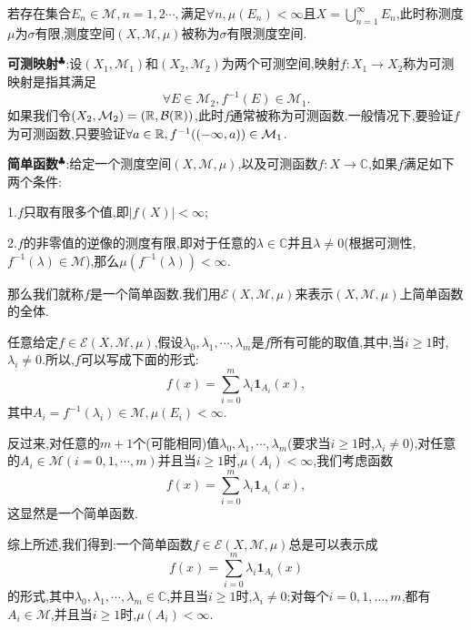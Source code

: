 若存在集合$E_n\in\mathcal{M},n=1,2\cdots,$满足$\forall n,\mu(E_n)<\infty$且$X=\bigcup_{n=1}^{\infty}E_n$,此时称测度$\mu$为$\sigma$有限,测度空间$(X,\mathcal{M},\mu)$被称为$\sigma$有限测度空间.\par
\textbf{可测映射}$^\clubsuit $:设$(X_1,\mathcal{M}_1)$和$(X_2,\mathcal{M}_2)$为两个可测空间,映射$f:X_1\to X_2$称为可测映射是指其满足
$$
\forall E\in\mathcal{M}_2,f^{-1}(E)\in\mathcal{M}_1.
$$
如果我们令$(X_2,\mathcal{M}_2)=(\mathbb{R},\mathcal{B}(\mathbb{R}))$,此时$f$通常被称为可测函数.一般情况下,要验证$f$为可测函数,只要验证$\forall a\in\mathbb{R},f^{-1}((-\infty,a))\in\mathcal{M}_1$.\par
\textbf{简单函数}$^\clubsuit $:给定一个测度空间$(X,\mathcal{M},\mu)$,以及可测函数$f:X\to \mathbb{C}$,如果$f$满足如下两个条件:\par
1.$f$只取有限多个值,即$|f(X)|<\infty$;\par
2.$f$的非零值的逆像的测度有限,即对于任意的$\lambda \in \mathbb{C}$并且$\lambda\neq 0$(根据可测性,$f^{-1}(\lambda)\in\mathcal{M}$),那么$\mu (f^{-1}(\lambda))<\infty$.\par
那么我们就称$f$是一个简单函数.我们用$\mathcal{E} (X,\mathcal{M},\mu)$来表示$(X,\mathcal{M},\mu)$上简单函数的全体.\par
任意给定$f\in \mathcal{E}(X,\mathcal{M},\mu)$,假设$\lambda _0,\lambda _1,\cdots,\lambda _m$是$f$所有可能的取值,其中,当$i\geqslant 1$时,$\lambda _i\neq 0$.所以,$f$可以写成下面的形式:
$$
f(x)=\sum_{i=0}^{m}\lambda _i\mathbf{1} _{A_i}(x),
$$
其中$A_i=f^{-1}(\lambda _i)\in\mathcal{M},\mu(E_i)<\infty$.\par
反过来,对任意的$m+1$个(可能相同)值$\lambda _0,\lambda _1,\cdots,\lambda _m$(要求当$i\geqslant 1$时,$\lambda _i\neq 0$),对任意的$A_i\in\mathcal{M}(i=0,1,\cdots,m)$并且当$i\geqslant 1$时,$\mu (A_i)<\infty$,我们考虑函数
$$
f(x)=\sum_{i=0}^{m}\lambda _i\mathbf{1} _{A_i}(x),
$$
这显然是一个简单函数.\par
综上所述,我们得到:一个简单函数$f\in \mathcal{E}(X,\mathcal{M},\mu)$总是可以表示成
$$
f(x)=\sum_{i=0}^{m}\lambda _i\mathbf{1} _{A_i}(x)
$$
的形式,其中$\lambda _0,\lambda _1,\cdots,\lambda _m\in\mathbb{C}$,并且当$i\geqslant 1$时,$\lambda _i\neq 0$;对每个$i=0,1,\dots,m$,都有$A_i\in\mathcal{M}$,并且当$i\geqslant 1$时,$\mu (A_i)<\infty$.\par































